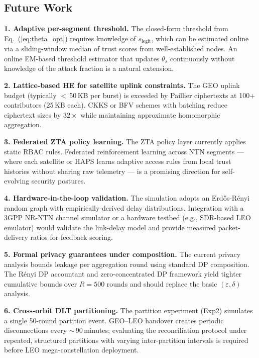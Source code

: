 \subsection{Future Work}

\textbf{1. Adaptive per-segment threshold.}
The closed-form threshold from Eq.~(\ref{eq:theta_opt}) requires
knowledge of $\bar{s}_{\mathrm{legit}}$, which can be estimated
online via a sliding-window median of trust scores from
well-established nodes.  An online EM-based threshold estimator
that updates $\theta_s$ continuously without knowledge of the
attack fraction is a natural extension.

\textbf{2. Lattice-based HE for satellite uplink constraints.}
The GEO uplink budget (typically $<$\,50\,KB per burst) is exceeded
by Paillier ciphertexts at 100+ contributors (25\,KB each).
CKKS or BFV schemes with batching reduce ciphertext sizes by
$32\times$ while maintaining approximate homomorphic aggregation.

\textbf{3. Federated ZTA policy learning.}
The ZTA policy layer currently applies static RBAC rules.
Federated reinforcement learning across NTN segments — where each
satellite or HAPS learns adaptive access rules from local trust
histories without sharing raw telemetry — is a promising direction
for self-evolving security postures.

\textbf{4. Hardware-in-the-loop validation.}
The simulation adopts an Erd\H{o}s-R{\'e}nyi random graph with
empirically-derived delay distributions.  Integration with a
3GPP NR-NTN channel simulator or a hardware testbed (e.g.,
SDR-based LEO emulator) would validate the link-delay model and
provide measured packet-delivery ratios for feedback scoring.

\textbf{5. Formal privacy guarantees under composition.}
The current privacy analysis bounds leakage per aggregation round
using standard DP composition.  The R{\'e}nyi DP accountant and
zero-concentrated DP framework yield tighter cumulative bounds over
$R=500$ rounds and should replace the basic $(\varepsilon,\delta)$
analysis.

\textbf{6. Cross-orbit DLT partitioning.}
The partition experiment (Exp2) simulates a single 50-round partition
event.  GEO–LEO handover creates periodic disconnections every
$\sim$\,90\,minutes; evaluating the reconciliation protocol under
repeated, structured partitions with varying inter-partition intervals
is required before LEO mega-constellation deployment.
